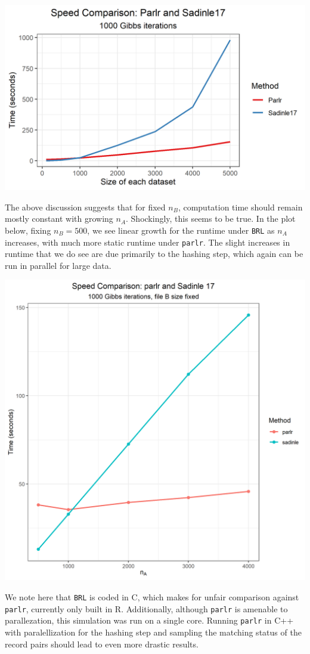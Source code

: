 \documentclass[
  12pt,
]{article}
\begin{document}
\begin{center}\includegraphics[width=23.6in]{../notes/figures/sadinle_speed_plot} \end{center}

The above discussion suggests that for fixed \(n_B\), computation time
should remain mostly constant with growing \(n_A\). Shockingly, this
seems to be true. In the plot below, fixing \(n_B = 500\), we see linear
growth for the runtime under \texttt{BRL} as \(n_A\) increases, with
much more static runtime under \texttt{parlr}. The slight increases in
runtime that we do see are due primarily to the hashing step, which
again can be run in parallel for large data.

\begin{center}\includegraphics[width=29.17in]{../notes/figures/speed_plot_fixed_nB} \end{center}

We note here that \texttt{BRL} is coded in C, which makes for unfair
comparison against \texttt{parlr}, currently only built in R.
Additionally, although \texttt{parlr} is amenable to parallezation, this
simulation was run on a single core. Running \texttt{parlr} in C++ with
paralellization for the hashing step and sampling the matching status of
the record pairs should lead to even more drastic results.
\end{document}
